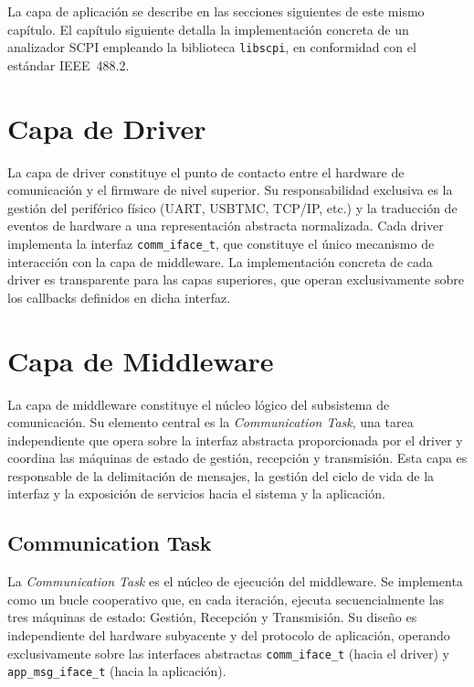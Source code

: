 La capa de aplicación se describe en las secciones siguientes de este mismo capítulo. El capítulo siguiente detalla la implementación concreta de un analizador SCPI empleando la biblioteca \texttt{libscpi}, en conformidad con el estándar IEEE~488.2.

\section{Capa de Driver}
\label{sec:capa-driver}

La capa de driver constituye el punto de contacto entre el hardware de comunicación y el firmware de nivel superior. Su responsabilidad exclusiva es la gestión del periférico físico (UART, USBTMC, TCP/IP, etc.) y la traducción de eventos de hardware a una representación abstracta normalizada. Cada driver implementa la interfaz \texttt{comm\_iface\_t}, que constituye el único mecanismo de interacción con la capa de middleware. La implementación concreta de cada driver es transparente para las capas superiores, que operan exclusivamente sobre los callbacks definidos en dicha interfaz.

\section{Capa de Middleware}
\label{sec:middleware}

La capa de middleware constituye el núcleo lógico del subsistema de comunicación. Su elemento central es la \textit{Communication Task}, una tarea independiente que opera sobre la interfaz abstracta proporcionada por el driver y coordina las máquinas de estado de gestión, recepción y transmisión. Esta capa es responsable de la delimitación de mensajes, la gestión del ciclo de vida de la interfaz y la exposición de servicios hacia el sistema y la aplicación.

\subsection{Communication Task}
\label{subsec:comm-task}

La \textit{Communication Task} es el núcleo de ejecución del middleware. Se implementa como un bucle cooperativo que, en cada iteración, ejecuta secuencialmente las tres máquinas de estado: Gestión, Recepción y Transmisión. Su diseño es independiente del hardware subyacente y del protocolo de aplicación, operando exclusivamente sobre las interfaces abstractas \texttt{comm\_iface\_t} (hacia el driver) y \texttt{app\_msg\_iface\_t} (hacia la aplicación).

